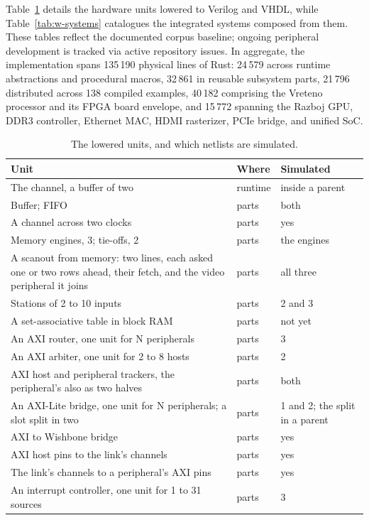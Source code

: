 \documentclass[journal,9pt]{IEEEtran}
\begin{document}
Table~\ref{tab:w-units} details the hardware units lowered to Verilog and VHDL,
while Table~\ref{tab:w-systems} catalogues the integrated systems composed from
them. These tables reflect the documented corpus baseline; ongoing peripheral
development is tracked via active repository issues. In aggregate, the
implementation spans 135\,190 physical lines of Rust: 24\,579 across runtime
abstractions and procedural macros, 32\,861 in reusable subsystem parts,
21\,796 distributed across 138 compiled examples, 40\,182 comprising the
Vreteno processor and its FPGA board envelope, and 15\,772 spanning the Razboj
GPU, DDR3 controller, Ethernet MAC, HDMI rasterizer, PCIe bridge, and unified
SoC.

\begin{table}[htbp]
\caption{The lowered units, and which netlists are simulated.}
\label{tab:w-units}
\centering\footnotesize
\begin{tabular}{@{}p{}lp{}@{}}
\toprule
Unit & Where & Simulated \\
\midrule
The channel, a buffer of two & runtime & inside a parent \\
Buffer; FIFO & parts & both \\
A channel across two clocks & parts & yes \\
Memory engines, 3; tie-offs, 2 & parts & the engines \\
A scanout from memory: two lines, each asked one or two rows ahead, their fetch, and the video peripheral it joins & parts & all three \\
Stations of 2 to 10 inputs & parts & 2 and 3 \\
A set-associative table in block RAM & parts & not yet \\
An AXI router, one unit for N peripherals & parts & 3 \\
An AXI arbiter, one unit for 2 to 8 hosts & parts & 2 \\
AXI host and peripheral trackers, the peripheral's also as two halves & parts & both \\
An AXI-Lite bridge, one unit for N peripherals; a slot split in two & parts & 1 and 2; the split in a parent \\
AXI to Wishbone bridge & parts & yes \\
AXI host pins to the link's channels & parts & yes \\
The link's channels to a peripheral's AXI pins & parts & yes \\
An interrupt controller, one unit for 1 to 31 sources & parts & 3 \\

\end{tabular}
\end{table}
\end{document}
